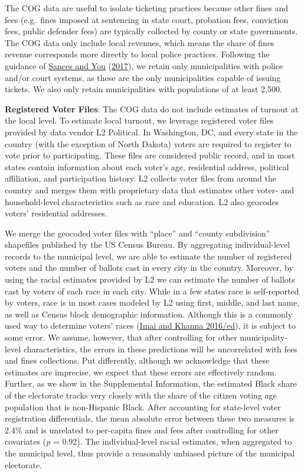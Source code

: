 \documentclass[
  12pt,
]{article}
\begin{document}
The COG data are useful to isolate ticketing practices because other fines and fees (e.g.~fines imposed at sentencing in state court, probation fees, conviction fees, public defender fees) are typically collected by county or state governments. The COG data only include local revenues, which means the share of fines revenue corresponds more directly to local police practices. Following the guidance of \protect\hyperlink{ref-Sances2017}{Sances and You} (\protect\hyperlink{ref-Sances2017}{2017}), we retain only municipalities with police and/or court systems, as these are the only municipalities capable of issuing tickets. We also only retain municipalities with populations of at least 2,500.

\textbf{Registered Voter Files}: The COG data do not include estimates of turnout at the local level. To estimate local turnout, we leverage registered voter files provided by data vendor L2 Political. In Washington, DC, and every state in the country (with the exception of North Dakota) voters are required to register to vote prior to participating. These files are considered public record, and in most states contain information about each voter's age, residential address, political affiliation, and participation history. L2 collects voter files from around the country and merges them with proprietary data that estimates other voter- and household-level characteristics such as race and education. L2 also geocodes voters' residential addresses.

We merge the geocoded voter files with ``place'' and ``county subdivision'' shapefiles published by the US Census Bureau. By aggregating individual-level records to the municipal level, we are able to estimate the number of registered voters and the number of ballots cast in every city in the country. Moreover, by using the racial estimates provided by L2 we can estimate the number of ballots cast by voters of each race in each city. While in a few states race is self-reported by voters, race is in most cases modeled by L2 using first, middle, and last name, as well as Census block demographic information. Although this is a commonly used way to determine voters' races (\protect\hyperlink{ref-Imai2016}{Imai and Khanna 2016/ed}), it is subject to some error. We assume, however, that after controlling for other municipality-level characteristics, the errors in these predictions will be uncorrelated with fees and fines collections. Put differently, although we acknowledge that these estimates are imprecise, we expect that these errors are effectively random. Further, as we show in the Supplemental Information, the estimated Black share of the electorate tracks very closely with the share of the citizen voting age population that is non-Hispanic Black. After accounting for state-level voter registration differentials, the mean absolute error between these two measures is 2.4\% and is unrelated to per-capita fines and fees after controlling for other covariates (\emph{p} = 0.92). The individual-level racial estimates, when aggregated to the municipal level, thus provide a reasonably unbiased picture of the municipal electorate.
\end{document}
